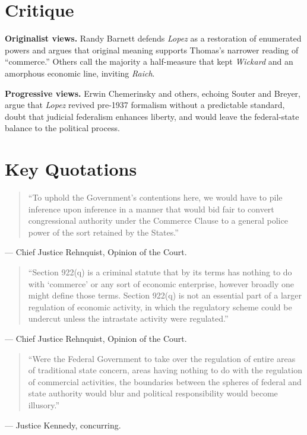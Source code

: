 \documentclass[12pt]{article}
\begin{document}
\section{Critique}

\textbf{Originalist views.} Randy Barnett defends \textit{Lopez} as a restoration of enumerated powers and argues that original meaning supports Thomas's narrower reading of ``commerce.'' Others call the majority a half-measure that kept \textit{Wickard} and an amorphous economic line, inviting \textit{Raich}.

\textbf{Progressive views.} Erwin Chemerinsky and others, echoing Souter and Breyer, argue that \textit{Lopez} revived pre-1937 formalism without a predictable standard, doubt that judicial federalism enhances liberty, and would leave the federal-state balance to the political process.

\section{Key Quotations}

\begin{quote}
``To uphold the Government's contentions here, we would have to pile inference upon inference in a manner that would bid fair to convert congressional authority under the Commerce Clause to a general police power of the sort retained by the States.''
\end{quote}
\noindent --- Chief Justice Rehnquist, Opinion of the Court.

\begin{quote}
``Section 922(q) is a criminal statute that by its terms has nothing to do with `commerce' or any sort of economic enterprise, however broadly one might define those terms. Section 922(q) is not an essential part of a larger regulation of economic activity, in which the regulatory scheme could be undercut unless the intrastate activity were regulated.''
\end{quote}
\noindent --- Chief Justice Rehnquist, Opinion of the Court.

\begin{quote}
``Were the Federal Government to take over the regulation of entire areas of traditional state concern, areas having nothing to do with the regulation of commercial activities, the boundaries between the spheres of federal and state authority would blur and political responsibility would become illusory.''
\end{quote}
\noindent --- Justice Kennedy, concurring.
\end{document}
